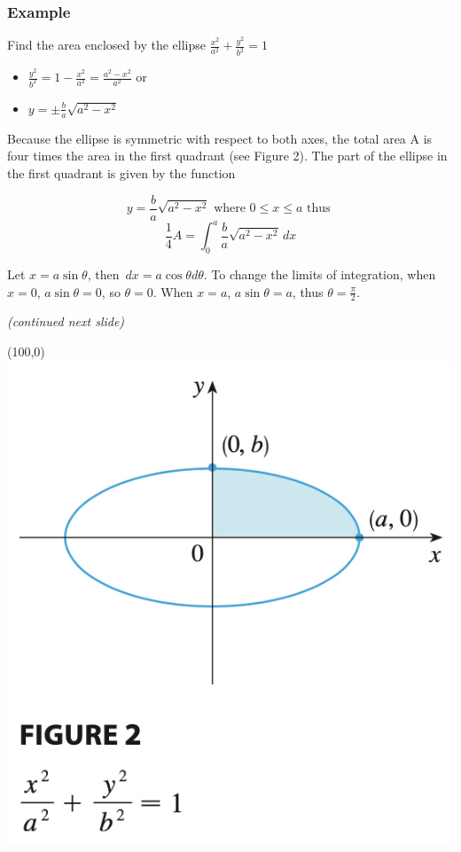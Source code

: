 \documentclass[t]{beamer}
\theoremstyle{plain}
\theoremstyle{definition}
\newcommand{\dx}{\,dx}
\begin{document}
\begin{frame}
\footnotesize
\frametitle{Example}
Find the area enclosed by the ellipse $\frac{x^2}{a^2}+\frac{y^2}{b^2}=1$ \pause

\begin{itemize}
	\item $\frac{y^2}{b^2} = 1 - \frac{x^2}{a^2} = \frac{a^2 - x^2}{a^2}$ or
	\item $y = \pm \frac{b}{a}\sqrt{a^2 - x^2}$
\end{itemize}

Because the ellipse is symmetric with respect to both axes,  the total area A is four times the area in the first quadrant (see Figure 2). The part of the ellipse in the first quadrant is given by the function

$$y = \frac{b}{a}\sqrt{a^2 - x^2}  \text{   where   }  0 \leq x \leq a \text{    thus    }$$
$$\frac{1}{4}A = \int_0^a\frac{b}{a}\sqrt{a^2 - x^2} \,dx$$

Let $x = a\sin\theta$, then $\dx = a\cos\theta d\theta$.  To change the limits of integration, when $x=0$, $a \sin\theta = 0$,  so $\theta = 0$.  When $x=a$, $a\sin\theta = a$, thus $\theta = \frac{\pi}{2}$.  

\medskip  

\textit{(continued next slide)}

\begin{textblock}{0.3}(100,0)
      \includegraphics[scale=0.3]{fig/eclipse}
\end{textblock}

\end{frame}
\end{document}
